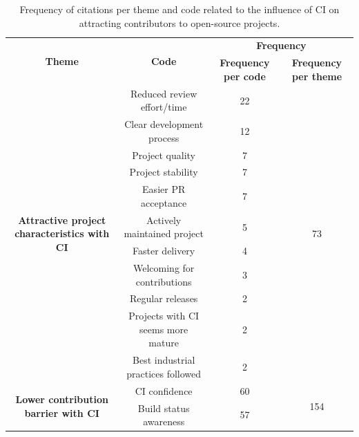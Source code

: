 	\begin{table}
		\centering
		\caption{Frequency of citations per theme and code related to the influence of CI on attracting contributors to open-source projects.}
    \begin{tabular}{cccc}
    \hline
    \multicolumn{1}{c}{\multirow{2}[4]{*}{\textbf{Theme}}} & \multicolumn{1}{c}{\multirow{2}[4]{*}{\textbf{Code}}} & \multicolumn{2}{p{10em}}{\textbf{Frequency}} \bigstrut\\
\cline{3-4}          &       & \multicolumn{1}{p{5em}}{\textbf{Frequency per code}} & \multicolumn{1}{p{5em}}{\textbf{Frequency per theme}} \bigstrut\\
    \hline
    \multicolumn{1}{c}{\multirow{11}[22]{*}{\parbox{3.2cm}{\centering \textbf{Attractive project characteristics with CI}}}} & \multicolumn{1}{p{14em}}{Reduced review effort/time} & 22    & \multirow{11}[22]{*}{73} \bigstrut\\
\cline{2-3}          & \multicolumn{1}{p{14em}}{Clear development process} & 12    &  \bigstrut\\
\cline{2-3}          & \multicolumn{1}{p{14em}}{Project quality} & 7     &  \bigstrut\\
\cline{2-3}          & \multicolumn{1}{p{14em}}{Project stability} & 7     &  \bigstrut\\
\cline{2-3}          & \multicolumn{1}{p{14em}}{Easier PR acceptance} & 7     &  \bigstrut\\
\cline{2-3}          & \multicolumn{1}{p{14em}}{Actively maintained project} & 5     &  \bigstrut\\
\cline{2-3}          & \multicolumn{1}{p{14em}}{Faster delivery} & 4     &  \bigstrut\\
\cline{2-3}          & \multicolumn{1}{p{14em}}{Welcoming for contributions} & 3     &  \bigstrut\\
\cline{2-3}          & \multicolumn{1}{p{14em}}{Regular releases} & 2     &  \bigstrut\\
\cline{2-3}          & \multicolumn{1}{p{14em}}{Projects with CI seems more mature} & 2     &  \bigstrut\\
\cline{2-3}          & \multicolumn{1}{p{14em}}{Best industrial practices followed} & 2     &  \bigstrut\\
    \hline
    \multicolumn{1}{c}{\multirow{5}[10]{*}{\parbox{3.2cm}{\centering \textbf{Lower contribution barrier with CI}}}} & \multicolumn{1}{p{14em}}{CI confidence} & 60    & \multirow{5}[10]{*}{154} \bigstrut\\
\cline{2-3}          & \multicolumn{1}{p{14em}}{Build status awareness} & 57    &  \bigstrut\\

\end{tabular}
\end{table}
